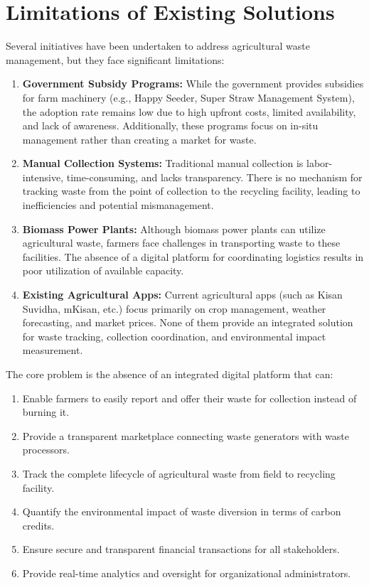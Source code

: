 \documentclass[a4paper,12pt,oneside]{report}
\let\originalitem\item
\renewcommand{\item}{\Needspace{10\baselineskip}\originalitem}
\begin{document}
\section{Limitations of Existing Solutions}

\noindent Several initiatives have been undertaken to address agricultural waste management, but they face significant limitations:

\begin{enumerate}
    \item \textbf{Government Subsidy Programs:} While the government provides subsidies for farm machinery (e.g., Happy Seeder, Super Straw Management System), the adoption rate remains low due to high upfront costs, limited availability, and lack of awareness. Additionally, these programs focus on in-situ management rather than creating a market for waste.

    \item \textbf{Manual Collection Systems:} Traditional manual collection is labor-intensive, time-consuming, and lacks transparency. There is no mechanism for tracking waste from the point of collection to the recycling facility, leading to inefficiencies and potential mismanagement.

    \item \textbf{Biomass Power Plants:} Although biomass power plants can utilize agricultural waste, farmers face challenges in transporting waste to these facilities. The absence of a digital platform for coordinating logistics results in poor utilization of available capacity.

    \item \textbf{Existing Agricultural Apps:} Current agricultural apps (such as Kisan Suvidha, mKisan, etc.) focus primarily on crop management, weather forecasting, and market prices. None of them provide an integrated solution for waste tracking, collection coordination, and environmental impact measurement.
\end{enumerate}

The core problem is the absence of an integrated digital platform that can:
\begin{enumerate}
    \item Enable farmers to easily report and offer their waste for collection instead of burning it.
    \item Provide a transparent marketplace connecting waste generators with waste processors.
    \item Track the complete lifecycle of agricultural waste from field to recycling facility.
    \item Quantify the environmental impact of waste diversion in terms of carbon credits.
    \item Ensure secure and transparent financial transactions for all stakeholders.
    \item Provide real-time analytics and oversight for organizational administrators.
\end{enumerate}
\end{document}
